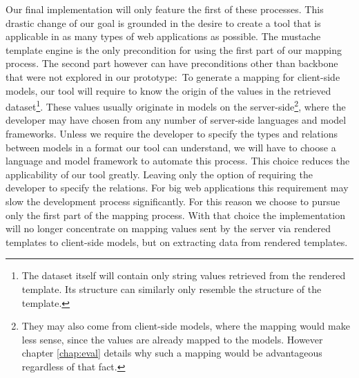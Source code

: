 \documentclass[thesis.tex]{subfiles}
\begin{document}
Our final implementation will only feature the first of these processes.
This drastic change of our goal is grounded in the desire to create a tool that
is applicable in as many types of web applications as possible.
The mustache template engine is the only precondition for using the first part
of our mapping process. The second part however can have preconditions
other than backbone that were not explored in our prototype:\
To generate a mapping for client-side models, our tool will require to know the
origin of the values in the retrieved dataset\footnote{
	The dataset itself will contain only string values retrieved from the rendered
	template. Its structure can similarly only resemble the structure of the
	template.
}. These values usually originate in models on the server-side\footnote{
	They may also come from client-side models, where the mapping would make less
	sense, since the values are already mapped to the models.
	However chapter \ref{chap:eval} details why such a mapping would be
	advantageous regardless of that fact.
}, where the developer may have chosen from any number of server-side languages
and model frameworks. Unless we require the developer to specify the types and
relations between models in a format our tool can understand, we will have to
choose a language and model framework to automate this process. This choice
reduces the applicability of our tool greatly. Leaving only the option of
requiring the developer to specify the relations. For big web applications this
requirement may slow the development process significantly.
For this reason we choose to pursue only the first part of the mapping process.
With that choice the implementation will no longer concentrate on mapping values
sent by the server via rendered templates to client-side models,
but on extracting data from rendered templates.
\end{document}
